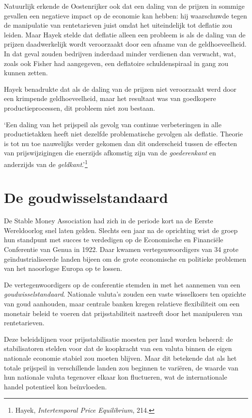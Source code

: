 \documentclass[
  a5paper,
  smalldemyvopaper,11pt,twoside,onecolumn,openright,extrafontsizes,
hidelinks]{memoir}
\renewenvironment{quote}%
               {\list{}{\rightmargin=.3cm\leftmargin=.3cm}%
                \itshape \item[]}%
               {\endlist}
\begin{document}
Natuurlijk erkende de Oostenrijker ook dat een daling van de prijzen in
sommige gevallen een negatieve impact op de economie kan hebben: hij
waarschuwde tegen de manipulatie van rentetarieven juist omdat het
uiteindelijk tot deflatie zou leiden. Maar Hayek stelde dat deflatie
alleen een probleem is als de daling van de prijzen daadwerkelijk wordt
veroorzaakt door een afname van de geldhoeveelheid. In dat geval zouden
bedrijven inderdaad minder verdienen dan verwacht, wat, zoals ook Fisher
had aangegeven, een deflatoire schuldenspiraal in gang zou kunnen
zetten.

Hayek benadrukte dat als de daling van de prijzen niet veroorzaakt werd
door een krimpende geldhoeveelheid, maar het resultaat was van
goedkopere productieprocessen, dit probleem niet zou bestaan.

\begin{quote}
`Een daling van het prijspeil als gevolg van continue verbeteringen in
alle productietakken heeft niet dezelfde problematische gevolgen als
deflatie. Theorie is tot nu toe nauwelijks verder gekomen dan dit
onderscheid tussen de effecten van prijswijzigingen die enerzijds
afkomstig zijn van de \emph{goederenkant} en anderzijds van de
\emph{geldkant}.'\footnote{\hspace{0pt}Hayek, \emph{Intertemporal Price
  Equilibrium}, 214.}
\end{quote}

\section{De goudwisselstandaard}\label{de-goudwisselstandaard}

De Stable Money Association had zich in de periode kort na de Eerste
Wereldoorlog snel laten gelden. Slechts een jaar na de oprichting wist
de groep hun standpunt met succes te verdedigen op de Economische en
Financiële Conferentie van Genua in 1922. Daar kwamen vertegenwoordigers
van 34 grote geïndustrialiseerde landen bijeen om de grote economische
en politieke problemen van het naoorlogse Europa op te lossen.

De vertegenwoordigers op de conferentie stemden in met het aannemen van
een \emph{goudwisselstandaard}. Nationale valuta's zouden een vaste
wisselkoers ten opzichte van goud aanhouden, maar centrale banken kregen
relatieve flexibiliteit om een monetair beleid te voeren dat
prijsstabiliteit nastreeft door het manipuleren van rentetarieven.

Deze beleidslijnen voor prijsstabilisatie moesten per land worden
beheerd: de stabilisatoren stelden voor dat de koopkracht van een valuta
binnen de eigen nationale economie stabiel zou moeten blijven. Maar dit
betekende dat als het totale prijspeil in verschillende landen zou
beginnen te variëren, de waarde van hun nationale valuta tegenover
elkaar kon fluctueren, wat de internationale handel potentieel kon
beïnvloeden.
\end{document}
